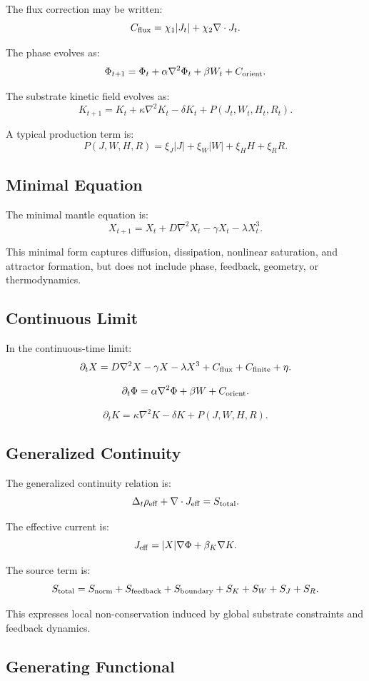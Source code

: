 \documentclass[11pt]{article}
\begin{document}
The flux correction may be written:
\[
C_{\rm flux}
=
\chi_1|J_t|+\chi_2\nabla\cdot J_t.
\]

The phase evolves as:
\[
\Phi_{t+1}
=
\Phi_t
+
\alpha\nabla^2\Phi_t
+
\beta W_t
+
C_{\rm orient}.
\]

The substrate kinetic field evolves as:
\[
K_{t+1}
=
K_t
+
\kappa\nabla^2K_t
-
\delta K_t
+
P(J_t,W_t,H_t,R_t).
\]

A typical production term is:
\[
P(J,W,H,R)
=
\xi_J|J|
+
\xi_W|W|
+
\xi_H H
+
\xi_R R.
\]

\subsection{Minimal Equation}

The minimal mantle equation is:
\[
X_{t+1}
=
X_t
+
D\nabla^2X_t
-
\gamma X_t
-
\lambda X_t^3.
\]

This minimal form captures diffusion, dissipation, nonlinear saturation, and attractor formation, but does not include phase, feedback, geometry, or thermodynamics.

\subsection{Continuous Limit}

In the continuous-time limit:
\[
\partial_tX
=
D\nabla^2X
-
\gamma X
-
\lambda X^3
+
C_{\rm flux}
+
C_{\rm finite}
+
\eta.
\]

\[
\partial_t\Phi
=
\alpha\nabla^2\Phi
+
\beta W
+
C_{\rm orient}.
\]

\[
\partial_tK
=
\kappa\nabla^2K
-
\delta K
+
P(J,W,H,R).
\]

\subsection{Generalized Continuity}

The generalized continuity relation is:
\[
\Delta_t\rho_{\rm eff}
+
\nabla\cdot J_{\rm eff}
=
S_{\rm total}.
\]

The effective current is:
\[
J_{\rm eff}
=
|X|\nabla\Phi+\beta_K\nabla K.
\]

The source term is:
\[
S_{\rm total}
=
S_{\rm norm}
+
S_{\rm feedback}
+
S_{\rm boundary}
+
S_K
+
S_W
+
S_J
+
S_R.
\]

This expresses local non-conservation induced by global substrate constraints and feedback dynamics.

\subsection{Generating Functional}
\end{document}
